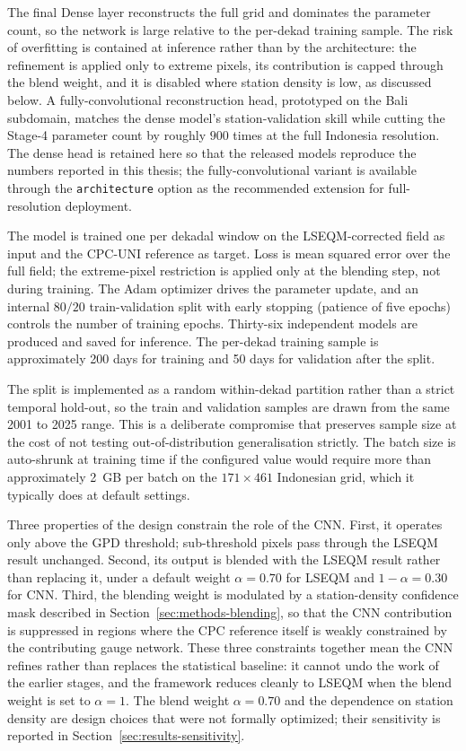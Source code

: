 The final Dense layer reconstructs the full grid and dominates the
parameter count, so the network is large relative to the per-dekad
training sample. The risk of overfitting is contained at inference
rather than by the architecture: the refinement is applied only to
extreme pixels, its contribution is capped through the blend
weight, and it is disabled where station density is low, as
discussed below. A fully-convolutional reconstruction head,
prototyped on the Bali subdomain, matches the dense model's
station-validation skill while cutting the Stage-4 parameter count
by roughly $900$ times at the full Indonesia resolution. The dense
head is retained here so that the released models reproduce the
numbers reported in this thesis; the fully-convolutional variant is
available through the \texttt{architecture} option as the
recommended extension for full-resolution deployment.

The model is trained one per dekadal window on the LSEQM-corrected
field as input and the CPC-UNI reference as target. Loss is
mean squared error over the full field; the extreme-pixel
restriction is applied only at the blending step, not during
training. The Adam
optimizer \citep{ref:kingma2014} drives the parameter update,
and an internal $80/20$ train-validation split with early
stopping (patience of five epochs) controls the number of
training epochs. Thirty-six independent models are produced
and saved for inference. The per-dekad training sample is
approximately 200 days for training and 50 days for validation
after the split.

The split is implemented as a random
within-dekad partition rather than a strict temporal hold-out,
so the train and validation samples are drawn from the same
2001 to 2025 range. This is a deliberate compromise that
preserves sample size at the cost of not testing
out-of-distribution generalisation strictly. The batch size
is auto-shrunk at training time if the configured value would
require more than approximately 2~GB per batch on the
$171 \times 461$ Indonesian grid, which it typically does at
default settings.

Three properties of the design constrain the role of the CNN.
First, it operates only above the GPD threshold; sub-threshold
pixels pass through the LSEQM result unchanged. Second, its
output is blended with the LSEQM result rather than replacing
it, under a default weight $\alpha = 0.70$ for LSEQM and
$1 - \alpha = 0.30$ for CNN. Third, the blending weight is
modulated by a station-density confidence mask described in
Section~\ref{sec:methods-blending}, so that the CNN contribution
is suppressed in regions where the CPC reference itself is
weakly constrained by the contributing gauge network. These
three constraints together mean the CNN refines rather than
replaces the statistical baseline: it cannot undo the work of
the earlier stages, and the framework reduces cleanly to LSEQM
when the blend weight is set to $\alpha = 1$. The blend weight
$\alpha = 0.70$ and the dependence on station density are
design choices that were not formally optimized; their
sensitivity is reported in
Section~\ref{sec:results-sensitivity}.

